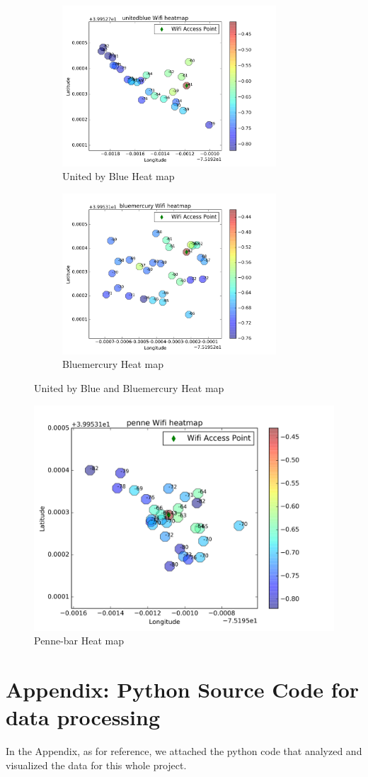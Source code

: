\documentclass[usletter,12pt]{article}
\begin{document}
\begin{figure}[!h]
	\begin{subfigure}{0.5\textwidth}
		\centering
		\includegraphics[width=1\linewidth, height=6cm]{unitedblue.png} 
		\caption{United by Blue Heat map}
	\end{subfigure}
	\begin{subfigure}{0.5\textwidth}
	    \centering
		\includegraphics[width=1\linewidth, height=6cm]{bluemercury.png}
		\caption{Bluemercury Heat map}
	\end{subfigure}
	\caption{United by Blue and Bluemercury Heat map}
	\label{fig:plot9&10}
\end{figure}
\begin{figure}[!h]
	\centering
	\includegraphics[width=1\linewidth]{penne.png}
	\caption{Penne-bar Heat map}
\label{fig:plot11}
\end{figure}
\clearpage

\section{Appendix: Python Source Code for data processing}
In the Appendix, as for reference, we attached the python code that analyzed and visualized the data for this whole project.

\end{document}
